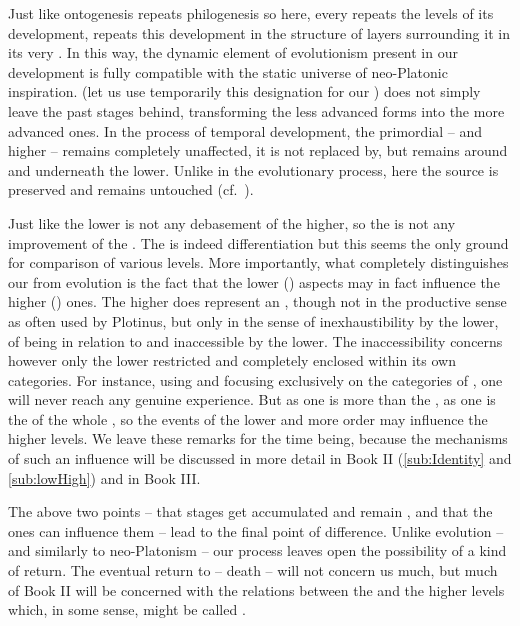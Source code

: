 Just like  ontogenesis repeats philogenesis so here, every  repeats
the levels of its development, repeats this development in the structure of
layers surrounding it in its very .  In this way, the dynamic
element of evolutionism present in our development is fully compatible with the
static universe of neo-Platonic inspiration.   (let us use
temporarily this designation for our ) does not simply leave
the past stages behind, transforming the less advanced forms into the more
advanced ones. In the process of temporal development, the primordial -- and
higher -- remains completely unaffected, it is not replaced by, but remains
around and underneath the lower. Unlike in the evolutionary process, here the
source is preserved and remains untouched (cf.~).

Just like the lower is not any debasement of the higher, so the  is
not any improvement of the . The  is indeed
differentiation but this seems the only ground for comparison of various levels.
More importantly, what completely distinguishes our  from
evolution is the fact that the lower () aspects may in fact influence
the higher () ones. The higher does represent an ,
though not in the productive sense as often used by Plotinus, but only in the
sense of inexhaustibility by the lower, of being  in relation
to and inaccessible by the lower. The inaccessibility concerns however only the
lower restricted and completely enclosed within its own categories. For
instance, using and focusing exclusively on the categories of , one will never reach any genuine experience. But as one is more
than the , as one is the  of the whole
, so the events of the lower and more  order may
influence the higher levels. We leave these remarks for the time being, because
the mechanisms of such an influence will be discussed in more detail in Book II
(\ref{sub:Identity} and \ref{sub:lowHigh}) and in Book III.

The above two points -- that  stages get accumulated and remain
, and that the  ones can influence them -- lead to the
final point of difference.  Unlike evolution -- and similarly to neo-Platonism
-- our process leaves open the possibility of a kind of return.  The eventual return to  --
death -- will not concern us much, but much of Book II will be concerned with
the relations between the  and the higher levels which, in
some sense, might be called .

